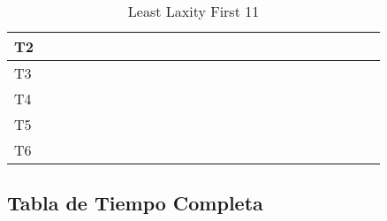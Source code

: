 \documentclass[xcolor=table]{beamer}
\begin{document}
\begin{frame}
\begin{table}
{\begin{tabular}{|l|l|l|l|l|l|l|l|l|l|l|l|l|l|l|l|l|l|l|l|l|l|l|l|l|}
T2 & \cellcolor{purple} & & & \cellcolor{purple} & & & \cellcolor{purple} & & & \cellcolor{purple} & & & \cellcolor{purple} & & & \cellcolor{purple} & & & \cellcolor{purple} & & & \cellcolor{purple} & & \\ \hline 
T3 & & & \cellcolor{cyan} & & & \cellcolor{cyan} & & & \cellcolor{cyan} & & & \cellcolor{cyan} & & & \cellcolor{cyan} & & & \cellcolor{cyan} & & & \cellcolor{cyan} & & & \cellcolor{cyan} \\ \hline 
T4 & & & & & & & & & & & & & & & & & & & & & & & & \\ \hline 
T5 & & & & & & & & & & & & & & & & & & & & & & & & \\ \hline 
T6 & & & & & & & & & & & & & & & & & & & & & & & & \\ \hline 
\end{tabular} 
} 
\caption{ Least Laxity First 11 } 
\end{table} 
\end{frame} 

\subsection{Tabla de Tiempo Completa} 
\end{document}
